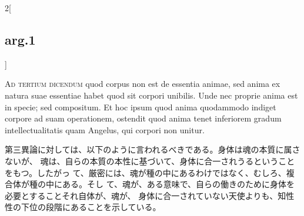 \documentclass[paper=a4paper,fontsize=10pt,jafontsize=9pt,titlepage]{jlreq}
\begin{document}
\begin{paracol}{2}[\subsection{arg.1}]
\switchcolumn*[\subsection{ad 3}]

{\scshape Ad tertium dicendum} quod corpus non est de essentia animae, sed anima
 ex natura suae essentiae habet quod sit corpori unibilis. Unde nec proprie
 anima est in specie; sed compositum. Et hoc ipsum quod anima quodammodo indiget
 corpore ad suam operationem, ostendit quod anima tenet inferiorem gradum
 intellectualitatis quam Angelus, qui corpori non unitur.

\switchcolumn

 第三異論に対しては、以下のように言われるべきである。身体は魂の本質に属さないが、
 魂は、自らの本質の本性に基づいて、身体に合一されうるということをもつ。したがっ
 て、厳密には、魂が種の中にあるわけではなく、むしろ、複合体が種の中にある。そし
 て、魂が、ある意味で、自らの働きのために身体を必要とすることそれ自体が、魂が、
 身体に合一されていない天使よりも、知性性の下位の段階にあることを示している。
\end{paracol}
\end{document}

